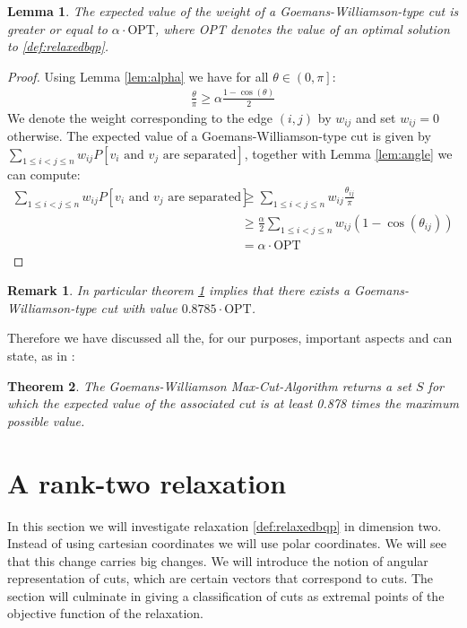 \documentclass[12pt,a4paper]{article}
\theoremstyle{mythm}
\newtheorem{thm}{Theorem}[section]
\newtheorem{lem}[thm]{Lemma}
\newtheorem*{rem}{Remark}
\begin{document}
\begin{lem}
\label{lem:GWalgo} 
The expected value of the weight of a Goemans-Williamson-type cut is greater or equal to $ \alpha \cdot \text{OPT}  $, where OPT denotes the value of an optimal solution to
\ref{def:relaxedbqp}.
\end{lem} 
\begin{proof}
Using Lemma \ref{lem:alpha} we have for all $ \theta \in \left( 0, \pi  \right]   $:
\begin{align*}
\frac{ \theta }{ \pi  } \geq \alpha \frac{ 1 - \cos( \theta )  }{ 2 }  
\end{align*} 
We denote the weight corresponding to the edge $ \left( i,j \right)  $ by $ w _{ ij }  $ and set $ w _{ ij } = 0 $ otherwise.
The expected value of a Goemans-Williamson-type cut is given by \\ $ \sum_{ 1 \leq i < j \leq n    }^{  } w _{ ij }  P \left[ v_i \text{ and } v_j \text{ are separated}  \right]
$, together with Lemma \ref{lem:angle} we can compute:
\begin{align*}
 \sum_{ 1 \leq i < j \leq n    }^{  } w _{ ij }  P \left[ v_i \text{ and } v_j \text{ are separated}  \right]
& \geq \sum_{ 1 \leq i < j \leq n    }^{  } w _{ ij }  \frac{ \theta _{ ij }  }{ \pi } \\
&\geq \frac{ \alpha }{ 2 }  \sum_{ 1 \leq i < j \leq n    }^{  } w _{ ij }  \left( 1 - \cos( \theta _{ ij }  )  \right)  \\
&= \alpha \cdot \text{OPT} 
\end{align*} 
\end{proof}
\begin{rem}
In particular theorem \ref{lem:GWalgo} implies that there exists a Goemans-Williamson-type cut with value $ 0.8785 \cdot \text{OPT} $.
\end{rem} 

Therefore we have discussed all the, for our purposes, important aspects and can state, as in \cite[Theorem 16.12]{Korte2018}:
\begin{thm}
The Goemans-Williamson  Max-Cut-Algorithm returns a set $ S $ for which the expected value of 
the associated cut is at least 0.878 times the maximum possible value.
\end{thm} 

\section{A rank-two relaxation} 
\label{rankTworelaxation} 
In this section we will investigate relaxation \ref{def:relaxedbqp} in dimension two.
Instead of using cartesian coordinates we will use polar coordinates.
We will see that this change carries big changes.
We will introduce the notion of angular representation of cuts, which are certain vectors that correspond to cuts.
The section will culminate in giving a classification of cuts as extremal points of the objective function of the relaxation.
\end{document}
